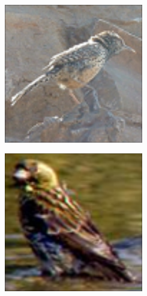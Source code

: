\documentclass[times, utf8, proizvoljni, numeric]{fer}
\newcommand{\rulesep}{\unskip\ \vrule\ }
\begin{document}
\begin{figure}[ht!]
\begin{subfigure}[t]{0.19\textwidth}
	\end{subfigure}
	\rulesep
	\begin{subfigure}[t]{0.19\textwidth}
		\includegraphics[width=\textwidth,height=\textwidth]{./imgs/demo-preporucitelja-po-sadrzaju/tijek-rada/id@4391.png}
	\end{subfigure}
	\begin{subfigure}[t]{0.19\textwidth}
		\includegraphics[width=\textwidth,height=\textwidth]{./imgs/demo-preporucitelja-po-sadrzaju/tijek-rada/id@3995.png}

\end{subfigure}
\end{figure}
\end{document}
